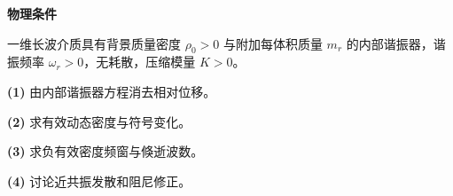\textbf{物理条件}\par 一维长波介质具有背景质量密度 \(\rho_0>0\) 与附加每体积质量 \(m_r\) 的内部谐振器，谐振频率 \(\omega_r>0\)，无耗散，压缩模量 \(K>0\)。
\par\noindent\textbf{(1)} 由内部谐振器方程消去相对位移。
\par\noindent\textbf{(2)} 求有效动态密度与符号变化。
\par\noindent\textbf{(3)} 求负有效密度频窗与倏逝波数。
\par\noindent\textbf{(4)} 讨论近共振发散和阻尼修正。
